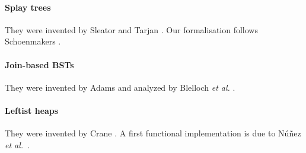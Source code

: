 \documentclass[11pt,a4paper]{article}
\begin{document}
\paragraph{Splay trees}
They were invented by Sleator and Tarjan \cite{SleatorT-JACM85}.
Our formalisation follows Schoenmakers \cite{Schoenmakers-IPL93}.

\paragraph{Join-based BSTs}
They were invented by Adams \cite{Adams-TR92,Adams-JFP93}
and analyzed by Blelloch \emph{et al.} \cite{BlellochFS-SPAA16}.

\paragraph{Leftist heaps}
They were invented by Crane \cite{Crane72}. A first functional implementation
is due to N\'u\~{n}ez \emph{et al.}~\cite{NunezPP95}.



\end{document}
